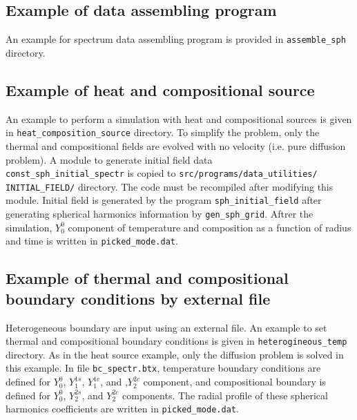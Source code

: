 \subsection{Example of data assembling program}
An example for spectrum data assembling program is provided in \verb|assemble_sph| directory.
%

\subsection{Example of heat and compositional source}
 An example to perform a simulation with heat and compositional sources is given in \verb|heat_composition_source| directory. To simplify the problem, only the thermal and compositional fields are evolved with no velocity (i.e. pure diffusion problem). A module to generate initial field data \\
 \verb|const_sph_initial_spectr| is copied to \verb|src/programs/data_utilities/|\\
\verb|INITIAL_FIELD/| directory. The code must be recompiled after modifying this module. Initial field is generated by the program \verb|sph_initial_field| after generating spherical harmonics information by \verb|gen_sph_grid|. Aftrer the simulation, $Y_{0}^{0}$ component of temperature and composition as a function of radius and time is written in \verb|picked_mode.dat|.

 \subsection{Example of thermal and compositional boundary conditions by external file}
 Heterogeneous boundary are input using an external file. An example to set thermal and compositional boundary conditions is given in \verb|heterogineous_temp| directory. As in the heat source example, only the diffusion problem is solved in this example. In file \verb|bc_spectr.btx|, temperature boundary conditions are defined for $Y_{0}^{0}$, $Y_{1}^{1s}$, $Y_{1}^{1c}$, and ,$ Y_{2}^{2c}$ component, and compositional boundary is defined for $Y_{0}^{0}$, $Y_{2}^{2s}$, and $Y_{2}^{2c}$ components. The radial profile of these spherical harmonics coefficients are written in \verb|picked_mode.dat|.



